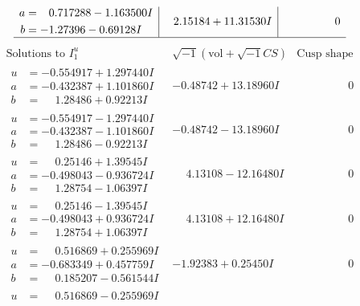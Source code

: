 \documentclass[1p]{elsarticle_modified}
\theoremstyle{definition}
\newcommand{\I}{\sqrt{-1}}
\begin{document}
$$\begin{array}{c|c|c}
\begin{aligned}
a &= \phantom{-}0.717288 - 1.163500 I \\
b &= -1.27396 - 0.69128 I\end{aligned}
 & \phantom{-}2.15184 + 11.31530 I & \phantom{-0.000000 } 0\\
 \hline 
 \end{array}$$\newpage$$\begin{array}{c|c|c}  
\text{Solutions to }I^u_{1}& \I (\text{vol} + \sqrt{-1}CS) & \text{Cusp shape}\\
 \hline 
\begin{aligned}
u &= -0.554917 + 1.297440 I \\
a &= -0.432387 + 1.101860 I \\
b &= \phantom{-}1.28486 + 0.92213 I\end{aligned}
 & -0.48742 + 13.18960 I & \phantom{-0.000000 } 0 \\ \hline\begin{aligned}
u &= -0.554917 - 1.297440 I \\
a &= -0.432387 - 1.101860 I \\
b &= \phantom{-}1.28486 - 0.92213 I\end{aligned}
 & -0.48742 - 13.18960 I & \phantom{-0.000000 } 0 \\ \hline\begin{aligned}
u &= \phantom{-}0.25146 + 1.39545 I \\
a &= -0.498043 - 0.936724 I \\
b &= \phantom{-}1.28754 - 1.06397 I\end{aligned}
 & \phantom{-}4.13108 - 12.16480 I & \phantom{-0.000000 } 0 \\ \hline\begin{aligned}
u &= \phantom{-}0.25146 - 1.39545 I \\
a &= -0.498043 + 0.936724 I \\
b &= \phantom{-}1.28754 + 1.06397 I\end{aligned}
 & \phantom{-}4.13108 + 12.16480 I & \phantom{-0.000000 } 0 \\ \hline\begin{aligned}
u &= \phantom{-}0.516869 + 0.255969 I \\
a &= -0.683349 + 0.457759 I \\
b &= \phantom{-}0.185207 - 0.561544 I\end{aligned}
 & -1.92383 + 0.25450 I & \phantom{-0.000000 } 0 \\ \hline\begin{aligned}
u &= \phantom{-}0.516869 - 0.255969 I \\

\end{aligned}
\end{array}$$
\end{document}
